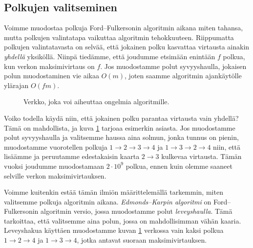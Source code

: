 \subsection{Polkujen valitseminen}

Voimme muodostaa polkuja Ford–Fulkersonin algoritmin aikana miten tahansa,
mutta polkujen valintatapa vaikuttaa algoritmin tehokkuuteen.
Riippumatta polkujen valintatavasta on selvää,
että jokainen polku kasvattaa virtausta ainakin \emph{yhdellä} yksiköllä.
Niinpä tiedämme, että joudumme etsimään enintään $f$ polkua,
kun verkon maksimivirtaus on $f$.
Jos muodostamme polut syvyyshaulla,
jokaisen polun muodostaminen vie aikaa $O(m)$,
joten saamme algoritmin ajankäytölle ylärajan $O(fm)$.

\begin{figure}
\center
\begin{center}
\end{center}
\caption{Verkko, joka voi aiheuttaa ongelmia algoritmille.}
\label{fig:polhuo}
\end{figure}

Voiko todella käydä niin, että jokainen polku parantaa
virtausta vain yhdellä?
Tämä on mahdollista, ja kuva \ref{fig:polhuo} tarjoaa esimerkin asiasta.
Jos muodostamme polut syvyyshaulla ja valitsemme haussa aina solmun,
jonka tunnus on pienin,
muodostamme vuorotellen polkuja $1 \rightarrow 2 \rightarrow 3 \rightarrow 4$
ja $1 \rightarrow 3 \rightarrow 2 \rightarrow 4$ niin, että
lisäämme ja peruutamme edestakaisin kaarta $2 \rightarrow 3$ kulkevaa virtausta.
Tämän vuoksi joudumme muodostamaan $2 \cdot 10^9$ polkua,
ennen kuin olemme saaneet selville verkon maksimivirtauksen.


Voimme kuitenkin estää tämän ilmiön määrittelemällä tarkemmin,
miten valitsemme polkuja algoritmin aikana.
\emph{Edmonds–Karpin algoritmi} on Ford–Fulkersonin algoritmin versio,
jossa muodostamme polut \emph{leveyshaulla}.
Tämä tarkoittaa, että valitsemme aina
polun, jossa on mahdollisimman vähän kaaria.
Leveyshakua käyttäen muodostamme kuvan \ref{fig:polhuo} verkossa
vain kaksi polkua $1 \rightarrow 2 \rightarrow 4$ ja
$1 \rightarrow 3 \rightarrow 4$, jotka antavat suoraan maksimivirtauksen.


